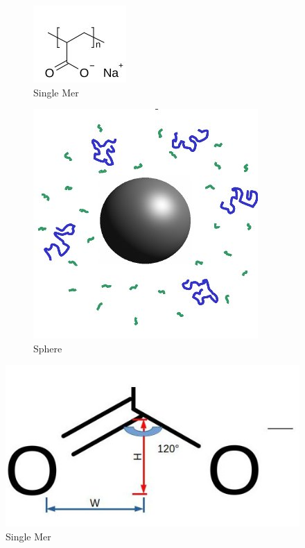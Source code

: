 \documentclass[10pt,letterpaper]{article}
\begin{document}
\begin{figure}[h!]%
    \centering
    \begin{subfigure}[b]{0.3\textwidth}
        \includegraphics[scale=0.5]{c-c.jpg}
        \caption{Single Mer}
        \label{fig:gull}
    \end{subfigure}
    \begin{subfigure}[b]{0.3\textwidth}
        \includegraphics[scale=0.25]{fig2.jpg}
        \caption{Sphere}
        \label{fig:mouse}
    \end{subfigure}
    \caption{}
\end{figure}

\begin{figure}[h!]
\centering
\includegraphics[scale=0.4]{angles.jpeg}
\caption{Single Mer}
\end{figure}
\end{document}
